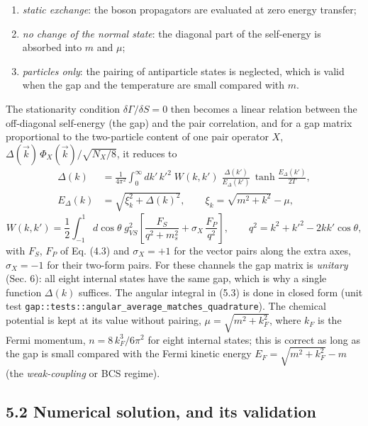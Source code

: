 \documentclass[
  10pt,
]{article}
\providecommand{\tightlist}{%
  \setlength{\itemsep}{0pt}\setlength{\parskip}{0pt}}
\begin{document}
\begin{enumerate}
\def\labelenumi{\arabic{enumi}.}
\tightlist
\item
  \emph{static exchange}: the boson propagators are evaluated at zero
  energy transfer;
\item
  \emph{no change of the normal state}: the diagonal part of the
  self-energy is absorbed into \(m\) and \(\mu\);
\item
  \emph{particles only}: the pairing of antiparticle states is
  neglected, which is valid when the gap and the temperature are small
  compared with \(m\).
\end{enumerate}

The stationarity condition \(\delta\Gamma/\delta S=0\) then becomes a
linear relation between the off-diagonal self-energy (the gap) and the
pair correlation, and for a gap matrix proportional to the two-particle
content of one pair operator \(X\),
\(\Delta(\vec k)\,\Phi_X(\vec k)/\sqrt{N_X/8}\), it reduces to
\[\begin{aligned}\Delta(k)&=\frac{1}{4\pi^2}\int_0^\infty dk'\,k'^2\;W(k,k')\;\frac{\Delta(k')}{E_\Delta(k')}\,\tanh\frac{E_\Delta(k')}{2T},\\
E_\Delta(k)&=\sqrt{\xi_k^2+\Delta(k)^2},\qquad\xi_k=\sqrt{m^2+k^2}-\mu,\end{aligned}\tag{5.2}\]
\[W(k,k')=\frac12\int_{-1}^{1}d\cos\theta\;g_{VS}^2\left[\frac{F_S}{q^2+m_s^2}+\sigma_X\,\frac{F_P}{q^2}\right],\qquad q^2=k^2+k'^2-2kk'\cos\theta,\tag{5.3}\]
with \(F_S\), \(F_P\) of Eq. (4.3) and \(\sigma_X=+1\) for the vector
pairs along the extra axes, \(\sigma_X=-1\) for their two-form pairs.
For these channels the gap matrix is \emph{unitary} (Sec. 6): all eight
internal states have the same gap, which is why a single function
\(\Delta(k)\) suffices. The angular integral in (5.3) is done in closed
form (unit test
\texttt{gap::tests::angular\_average\_matches\_quadrature}). The
chemical potential is kept at its value without pairing,
\(\mu=\sqrt{m^2+k_F^2}\), where \(k_F\) is the Fermi momentum,
\(n=8\,k_F^3/6\pi^2\) for eight internal states; this is correct as long
as the gap is small compared with the Fermi kinetic energy
\(E_F=\sqrt{m^2+k_F^2}-m\) (the \emph{weak-coupling} or BCS regime).

\hypertarget{numerical-solution-and-its-validation}{%
\subsection{5.2 Numerical solution, and its
validation}\label{numerical-solution-and-its-validation}}
\end{document}
